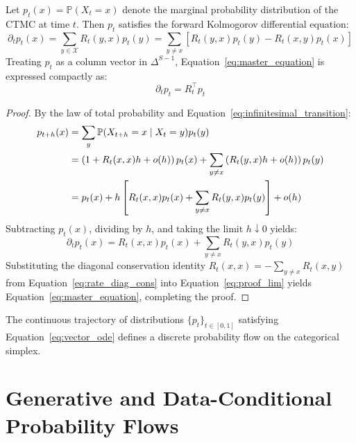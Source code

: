 \begin{thm}
Let $p_t(x) = \mathbb{P}(X_t = x)$ denote the marginal probability distribution of the CTMC at time $t$. Then $p_t$ satisfies the forward Kolmogorov differential equation:
\begin{equation}
\partial_t p_t(x) = \sum_{y \in \mathcal{X}} R_t(y, x) p_t(y) = \sum_{y \ne x} \left[ R_t(y, x) p_t(y) - R_t(x, y) p_t(x) \right]
\label{eq:master_equation}
\end{equation}
Treating $p_t$ as a column vector in $\Delta^{S-1}$, Equation~\ref{eq:master_equation} is expressed compactly as:
\begin{equation}
\partial_t p_t = R_t^\top p_t
\label{eq:vector_ode}
\end{equation}
\end{thm}

\begin{proof}
By the law of total probability and Equation~\ref{eq:infinitesimal_transition}:
\begin{align}
p_{t+h}(x) &= \sum_{y} \mathbb{P}(X_{t+h} = x \mid X_t = y) p_t(y) \notag \\
&= \left( 1 + R_t(x, x) h + o(h) \right) p_t(x) + \sum_{y \ne x} \left( R_t(y, x) h + o(h) \right) p_t(y) \notag \\
&= p_t(x) + h \left[ R_t(x, x) p_t(x) + \sum_{y \ne x} R_t(y, x) p_t(y) \right] + o(h) \label{eq:proof_taylor}
\end{align}
Subtracting $p_t(x)$, dividing by $h$, and taking the limit $h \downarrow 0$ yields:
\begin{equation}
\partial_t p_t(x) = R_t(x, x) p_t(x) + \sum_{y \ne x} R_t(y, x) p_t(y)
\label{eq:proof_lim}
\end{equation}
Substituting the diagonal conservation identity $R_t(x, x) = - \sum_{y \ne x} R_t(x, y)$ from Equation~\ref{eq:rate_diag_cons} into Equation~\ref{eq:proof_lim} yields Equation~\ref{eq:master_equation}, completing the proof.
\end{proof}

The continuous trajectory of distributions $\{p_t\}_{t \in [0, 1]}$ satisfying Equation~\ref{eq:vector_ode} defines a discrete probability flow on the categorical simplex.

\section{Generative and Data-Conditional Probability Flows}

